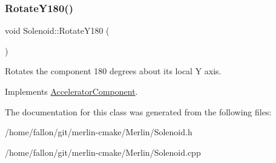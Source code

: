 \subsubsection{\texorpdfstring{Rotate\+Y180()}{RotateY180()}}
{\footnotesize\ttfamily void Solenoid\+::\+Rotate\+Y180 (\begin{DoxyParamCaption}{ }\end{DoxyParamCaption})\hspace{0.3cm}{\ttfamily [virtual]}}

Rotates the component 180 degrees about its local Y axis. 

Implements \hyperlink{classAcceleratorComponent_a8bf0d39b56578ca99f286ca1504b9072}{Accelerator\+Component}.



The documentation for this class was generated from the following files\+:\begin{DoxyCompactItemize}
\item 
/home/fallon/git/merlin-\/cmake/\+Merlin/Solenoid.\+h\item 
/home/fallon/git/merlin-\/cmake/\+Merlin/Solenoid.\+cpp\end{DoxyCompactItemize}
